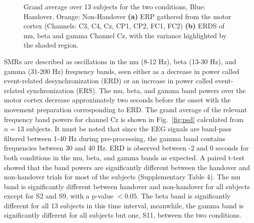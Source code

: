  \begin{figure*}[t]
    \centering
        \caption{Grand average over 13 subjects for the two conditions, Blue: Handover, Orange: Non-Handover \textbf{(a)} ERP gathered from the motor cortex (Channels: C3, C4, Cz, CP1, CP2, FC1, FC2) \textbf{(b)} ERDS of mu, beta and gamma Channel Cz, with the variance highlighted by the shaded region.}
   \label{fig:erp_psd}
 \end{figure*}

SMRs are described as oscillations in the mu (8-12 Hz), beta (13-30 Hz), and gamma (31-200 Hz) frequency bands, seen either as a decrease in power called event-related desynchronization (ERD) or an increase in power called event-related synchronization (ERS). The mu, beta, and gamma band powers over the motor cortex decrease approximately two seconds before the onset with the movement preparation corresponding to ERD. The grand average of the relevant frequency band powers for channel Cz is shown in Fig.~\ref{fig:psd} calculated from $n=13$ subjects. It must be noted that since the EEG signals are band-pass filtered between 1-40 Hz during pre-processing, the gamma band contains frequencies between 30 and 40 Hz. ERD is observed between -2 and 0 seconds for both conditions in the mu, beta, and gamma bands as expected. A paired t-test showed that the band powers are significantly different between the handover and non-handover trials for most of the subjects (Supplementary Table 4).
The mu band is significantly different between handover and non-handover for all subjects except for S2 and S9, with a p-value $<0.05$. The beta band is significantly different for all 13 subjects in this time interval, meanwhile, the gamma band is significantly different for all subjects but one, S11, between the two conditions.
